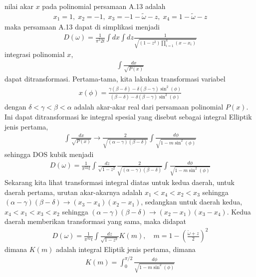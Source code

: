nilai akar $x$ pada polinomial persamaan A.13 adalah
\begin{align}
x_1 = 1, \; x_2 = -1, \; x_3 = -1 - \tilde{\omega} - z, \; x_4 = 1 - \tilde{\omega} - z 
\end{align}
maka persamaan A.13 dapat di simplikasi menjadi
\begin{align}
D(\omega) = \frac{1}{\pi^3 2t}\int dx \int dz \frac{1}{\sqrt{(1-z^2)\prod_{i=1}^4 ( x - x_i )}}
\end{align}
integrasi polinomial $x$,
\begin{align}
\int \frac{dx}{\sqrt{P(x)}}
\end{align}
dapat ditransformasi. Pertama-tama, kita lakukan transformasi variabel
\begin{align}
x(\phi) = \frac{\gamma(\beta - \delta) - \delta(\beta - \gamma)\sin^2(\phi)}{(\beta-\delta) - \delta(\beta - \gamma)\sin^2(\phi)}
\end{align}
dengan $\delta < \gamma < \beta < \alpha$ adalah akar-akar real dari persamaan polinomial $P(x)$. Ini dapat ditransformasi ke integral spesial yang disebut sebagai integral Elliptik jenis pertama,
\begin{align}
\int \frac{dx}{\sqrt{P(x)}} \rightarrow \frac{2}{\sqrt{(\alpha - \gamma)(\beta - \delta)}}\int \frac{d\phi}{\sqrt{1 - m\sin^2(\phi)}}
\end{align}
sehingga DOS kubik menjadi
\begin{align}
D(\omega) = \frac{1}{\pi^32t}\int \frac{dz}{\sqrt{1-z^2}}\frac{2}{\sqrt{(\alpha - \gamma)(\beta -\delta)}} \int \frac{d\phi}{\sqrt{1 - m\sin^2(\phi)}}
\end{align}
Sekarang kita lihat transformasi integral diatas untuk kedua daerah, untuk daerah pertama, urutan akar-akarnya adalah $x_1 < x_4 < x_2 < x_3$ sehingga $(\alpha - \gamma)(\beta -\delta) \rightarrow (x_3 - x_4)(x_2 - x_1)$, sedangkan untuk daerah kedua, $x_4 < x_1 < x_3 < x_2$ sehingga $(\alpha - \gamma)(\beta -\delta) \rightarrow (x_2 - x_1)(x_3 - x_4)$. Kedua daerah memberikan transformasi yang sama, maka didapat
\begin{align}
D(\omega) = \frac{1}{\pi^32t}\int \frac{dz}{\sqrt{1-z^2}} K(m), \quad m = 1 - \left( \frac{\tilde{\omega} + z}{2} \right)^2
\end{align}
dimana $K(m)$ adalah integral Eliptik jenis pertama, dimana
\begin{align}
K(m) = \int_0^{\pi/2} \frac{d\phi}{\sqrt{1 - m\sin^2(\phi)}}
\end{align}

